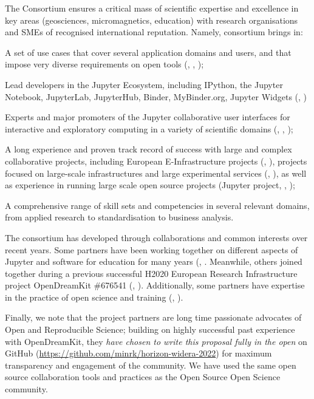 The Consortium ensures a critical mass of scientific expertise and excellence
in key areas (geosciences, micromagnetics, education) with research organisations and SMEs of recognised
 international reputation.
 Namely, \TheProject consortium brings in:
\begin{compactitem}
\item A set of use cases that cover several application domains and users, and that impose very diverse
requirements on open tools (, , );
\item Lead developers in the Jupyter Ecosystem, including IPython, the Jupyter Notebook, JupyterLab,
JupyterHub, Binder, MyBinder.org, Jupyter Widgets (, )
\item Experts and major promoters of the Jupyter collaborative user interfaces for interactive and exploratory
computing in a variety of scientific domains (, , );
\item A long experience and proven track record of success with large and complex collaborative projects,
including
European E-Infrastructure projects (, ),
projects focused on large-scale infrastructures and large experimental services (, ),
as well as experience in running large scale open source projects (Jupyter project, , );
\item A comprehensive range of skill sets and competencies in several relevant domains,
from applied research to standardisation to business analysis.
\end{compactitem}

The consortium has developed through collaborations and common interests over recent years.
Some partners have been working together on different aspects of Jupyter
and software for education for many years (, .
Meanwhile, others joined together during a previous successful
H2020 European Research Infrastructure project OpenDreamKit \#676541 (, ).
Additionally, some partners have expertise in the practice of open science and training (, ).

Finally, we note that the project partners are long time passionate
advocates of Open and Reproducible Science;
building on highly successful past experience with OpenDreamKit, they
\emph{have chosen to write this proposal fully in the open} on GitHub
(\href{https://github.com/minrk/horizon-widera-2022}{https://github.com/minrk/horizon-widera-2022}) for maximum transparency
and engagement of the community.
We have used the same open source collaboration tools and practices
as the Open Source Open Science community.

% 
